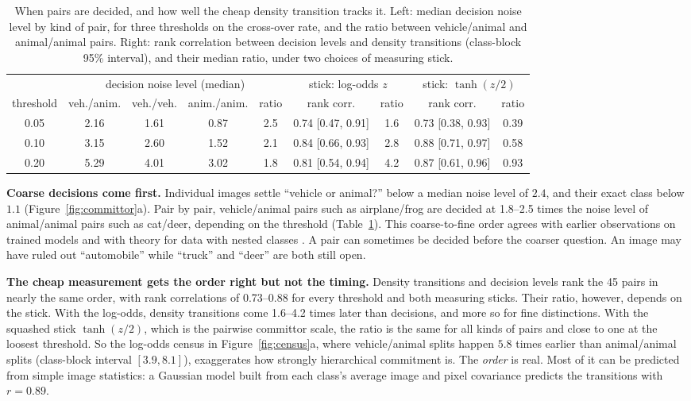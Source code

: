 \documentclass[11pt]{article}
\newcommand{\para}[1]{\textbf{#1}\hspace{0.6em}}
\begin{document}
\begin{table}[t]
\centering
\caption{When pairs are decided, and how well the cheap density transition tracks it. Left: median decision noise level by kind of pair, for three thresholds on the cross-over rate, and the ratio between vehicle/animal and animal/animal pairs. Right: rank correlation between decision levels and density transitions (class-block 95\% interval), and their median ratio, under two choices of measuring stick.}
\label{tab:decisions}
\footnotesize\setlength{\tabcolsep}{3.5pt}
\begin{tabular}{c|cccc|cc|cc}
\toprule
 & \multicolumn{4}{c|}{decision noise level (median)} & \multicolumn{2}{c|}{stick: log-odds $z$} & \multicolumn{2}{c}{stick: $\tanh(z/2)$} \\
threshold & veh./anim. & veh./veh. & anim./anim. & ratio & rank corr. & ratio & rank corr. & ratio \\
\midrule
0.05 & 2.16 & 1.61 & 0.87 & 2.5 & 0.74 [0.47, 0.91] & 1.6 & 0.73 [0.38, 0.93] & 0.39 \\
0.10 & 3.15 & 2.60 & 1.52 & 2.1 & 0.84 [0.66, 0.93] & 2.8 & 0.88 [0.71, 0.97] & 0.58 \\
0.20 & 5.29 & 4.01 & 3.02 & 1.8 & 0.81 [0.54, 0.94] & 4.2 & 0.87 [0.61, 0.96] & 0.93 \\
\bottomrule
\end{tabular}
\end{table}

\para{Coarse decisions come first.}
Individual images settle ``vehicle or animal?'' below a median noise level of $2.4$, and their exact class below $1.1$ (Figure~\ref{fig:committor}a). Pair by pair, vehicle/animal pairs such as airplane/frog are decided at 1.8--2.5 times the noise level of animal/animal pairs such as cat/deer, depending on the threshold (Table~\ref{tab:decisions}). This coarse-to-fine order agrees with earlier observations on trained models \citep{handke2025measuring,sclocchi2025phase} and with theory for data with nested classes \citep{achilli2026theory}. A pair can sometimes be decided before the coarser question. An image may have ruled out ``automobile'' while ``truck'' and ``deer'' are both still open.

\para{The cheap measurement gets the order right but not the timing.}
Density transitions and decision levels rank the 45 pairs in nearly the same order, with rank correlations of 0.73--0.88 for every threshold and both measuring sticks. Their ratio, however, depends on the stick. With the log-odds, density transitions come 1.6--4.2 times later than decisions, and more so for fine distinctions. With the squashed stick $\tanh(z/2)$, which is the pairwise committor scale, the ratio is the same for all kinds of pairs and close to one at the loosest threshold. So the log-odds census in Figure~\ref{fig:census}a, where vehicle/animal splits happen $5.8$ times earlier than animal/animal splits (class-block interval $[3.9,8.1]$), exaggerates how strongly hierarchical commitment is. The \emph{order} is real. Most of it can be predicted from simple image statistics: a Gaussian model built from each class's average image and pixel covariance predicts the transitions with $r=0.89$.
\end{document}
